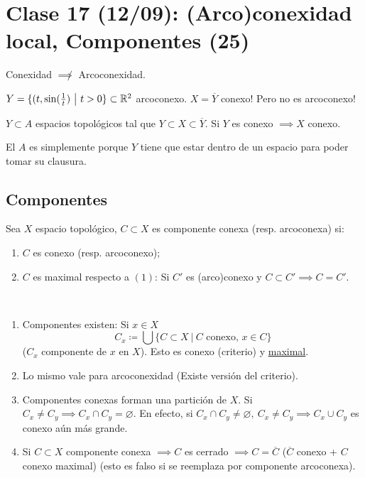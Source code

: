 \section{Clase 17 (12/09): (Arco)conexidad local, Componentes (25)}

\begin{observe}
	Conexidad $\not\implies$ Arcoconexidad.
\end{observe}
\begin{eg}
	$Y = \{(t,\sin(\frac{1}{t}) \ \big| \ t > 0\} \subset \mathbb{R}^2$ arcoconexo. $X = \overline{Y}$ conexo! Pero no es arcoconexo! 
\end{eg}

\begin{lemma}
	$Y \subset A$ espacios topológicos tal que $Y \subset X \subset \overline{Y}$. Si $Y$ es conexo $\implies X$ conexo.
\end{lemma}
\begin{note}
	El $A$ es simplemente porque $Y$ tiene que estar dentro de un espacio para poder tomar su clausura.
\end{note}

\subsection*{Componentes}

\begin{definition}
	Sea $X$ espacio topológico, $C \subset X$ es componente conexa (resp. arcoconexa) si:
	\begin{enumerate}
		\item $C$ es conexo (resp. arcoconexo);

		\item $C$ es maximal respecto a $(1)$: Si $C'$ es (arco)conexo y $C \subset C' \implies C = C'$.
	\end{enumerate}
\end{definition}

\begin{observe}~
	\begin{enumerate}
		\item Componentes existen: Si $x \in X$
		\[ C_x \coloneq \bigcup \{C \subset X \ \big| \ C \text{ conexo, } x \in C\} \]
		($C_x$ componente de $x$ en $X$). Esto es conexo (criterio) y \underline{maximal}.

		\item Lo mismo vale para arcoconexidad (Existe versión del criterio).

		\item Componentes conexas forman una partición de $X$. Si $C_x \neq C_y \implies C_x \cap C_y = \varnothing$. En efecto, si $C_x \cap C_y \neq \varnothing,\ C_x \neq C_y \implies C_x \cup C_y$ es conexo aún más grande.

		\item Si $C \subset X$ componente conexa $\implies C$ es cerrado $\implies C = \overline{C}$ ($\overline{C}$ conexo + $C$ conexo maximal) (esto es falso si se reemplaza por componente arcoconexa).
	\end{enumerate}
\end{observe}


